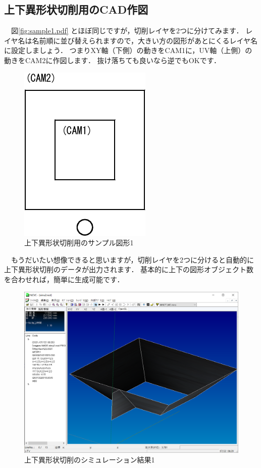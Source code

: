 

\subsection{上下異形状切削用のCAD作図}
　図\ref{fig:sample1.pdf} とほぼ同じですが，切削レイヤを2つに分けてみます．
レイヤ名は名前順に並び替えられますので，大きい方の図形があとにくるレイヤ名に設定しましょう．
つまりXY軸（下側）の動きをCAM1に，UV軸（上側）の動きをCAM2に作図します．
抜け落ちても良いなら逆でもOKです．

\begin{figure}[H]
\centering
\includegraphics{No2/fig/sample2-crop.pdf}
\caption{上下異形状切削用のサンプル図形1}
\label{fig:sample2.pdf}
\end{figure}

　もうだいたい想像できると思いますが，切削レイヤを2つに分けると自動的に上下異形状切削のデータが出力されます．
基本的に上下の図形オブジェクト数を合わせれば，簡単に生成可能です．

\begin{figure}[H]
\centering
\includegraphics[scale=0.5]{No2/fig/simu2.png}
\caption{上下異形状切削のシミュレーション結果1}
\label{fig:simu2.png}
\end{figure}

